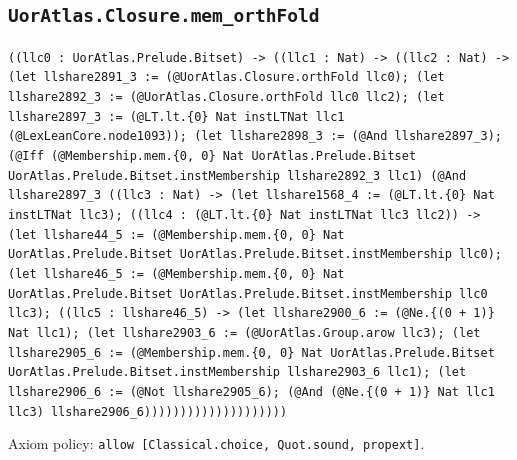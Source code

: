 \documentclass[11pt]{article}
\begin{document}
\subsection*{\texttt{UorAtlas.Closure.mem\_orthFold}}
\noindent\texttt{((llc0 : UorAtlas.Prelude.Bitset) -> ((llc1 : Nat) -> ((llc2 : Nat) -> (let llshare2891\_3 := (@UorAtlas.Closure.orthFold llc0); (let llshare2892\_3 := (@UorAtlas.Closure.orthFold llc0 llc2); (let llshare2897\_3 := (@LT.lt.\{0\} Nat instLTNat llc1 (@LexLeanCore.node1093)); (let llshare2898\_3 := (@And llshare2897\_3); (@Iff (@Membership.mem.\{0, 0\} Nat UorAtlas.Prelude.Bitset UorAtlas.Prelude.Bitset.instMembership llshare2892\_3 llc1) (@And llshare2897\_3 ((llc3 : Nat) -> (let llshare1568\_4 := (@LT.lt.\{0\} Nat instLTNat llc3); ((llc4 : (@LT.lt.\{0\} Nat instLTNat llc3 llc2)) -> (let llshare44\_5 := (@Membership.mem.\{0, 0\} Nat UorAtlas.Prelude.Bitset UorAtlas.Prelude.Bitset.instMembership llc0); (let llshare46\_5 := (@Membership.mem.\{0, 0\} Nat UorAtlas.Prelude.Bitset UorAtlas.Prelude.Bitset.instMembership llc0 llc3); ((llc5 : llshare46\_5) -> (let llshare2900\_6 := (@Ne.\{(0 + 1)\} Nat llc1); (let llshare2903\_6 := (@UorAtlas.Group.arow llc3); (let llshare2905\_6 := (@Membership.mem.\{0, 0\} Nat UorAtlas.Prelude.Bitset UorAtlas.Prelude.Bitset.instMembership llshare2903\_6 llc1); (let llshare2906\_6 := (@Not llshare2905\_6); (@And (@Ne.\{(0 + 1)\} Nat llc1 llc3) llshare2906\_6))))))))))))))))))))}\par
\noindent Axiom policy: \texttt{allow [Classical.choice, Quot.sound, propext]}.\par
\end{document}

